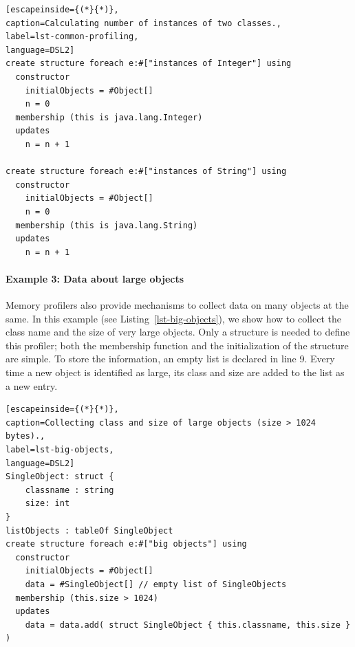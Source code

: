 \begin{lstlisting}[escapeinside={(*}{*)},
caption=Calculating number of instances of two classes., 
label=lst-common-profiling,
language=DSL2]
create structure foreach e:#["instances of Integer"] using
  constructor
    initialObjects = #Object[]
    n = 0
  membership (this is java.lang.Integer)
  updates
    n = n + 1

create structure foreach e:#["instances of String"] using
  constructor
    initialObjects = #Object[]
    n = 0
  membership (this is java.lang.String)
  updates
    n = n + 1
\end{lstlisting}

\paragraph{Example 3: Data about large objects} 
Memory profilers also provide mechanisms to collect data on many objects at the same.
In this example (see Listing~\ref{lst-big-objects}), we show how to collect the class name and the size of very large objects.
Only a structure is needed to define this profiler; both the membership function and the initialization of the structure are simple.
To store the information, an empty list is declared in line 9.
Every time a new object is identified as large, its class and size are added to the list as a new entry. 

\begin{lstlisting}[escapeinside={(*}{*)},
caption=Collecting class and size of large objects (size > 1024 bytes)., 
label=lst-big-objects,
language=DSL2]
SingleObject: struct {
	classname : string
	size: int
}
listObjects : tableOf SingleObject
create structure foreach e:#["big objects"] using
  constructor
    initialObjects = #Object[]
    data = #SingleObject[] // empty list of SingleObjects
  membership (this.size > 1024)
  updates
    data = data.add( struct SingleObject { this.classname, this.size } )
\end{lstlisting}
%
%

